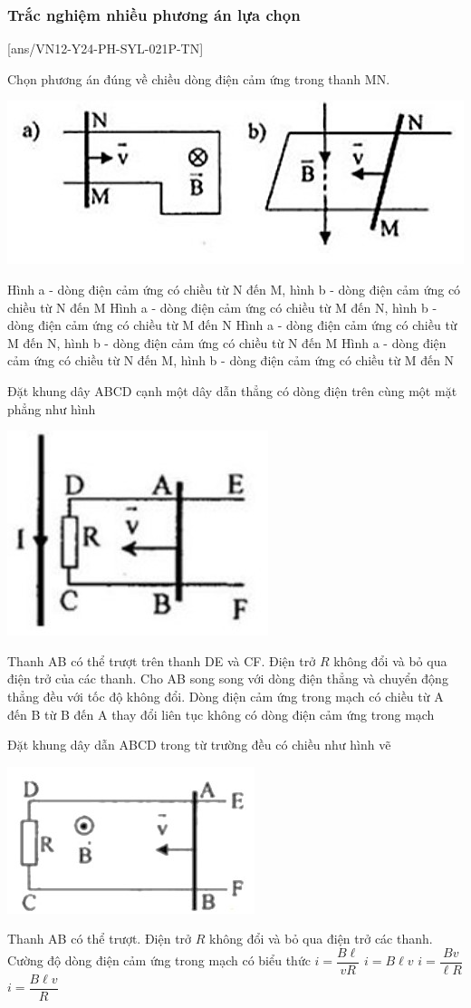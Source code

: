 \subsubsection{Trắc nghiệm nhiều phương án lựa chọn}
\setcounter{ex}{0}
[ans/VN12-Y24-PH-SYL-021P-TN]
\begin{ex}
	Chọn phương án đúng về chiều dòng điện cảm ứng trong thanh MN.
	\begin{center}
		\includegraphics[width=0.4\linewidth]{figs/VN12-Y24-PH-SYL-022P-1}
	\end{center}
	\choice
	{Hình a - dòng điện cảm ứng có chiều từ N đến M, hình b - dòng điện cảm ứng có chiều từ N đến M}
	{Hình a - dòng điện cảm ứng có chiều từ M đến N, hình b - dòng điện cảm ứng có chiều từ M đến N}
	{\True Hình a - dòng điện cảm ứng có chiều từ M đến N, hình b - dòng điện cảm ứng có chiều từ N đến M}
	{Hình a - dòng điện cảm ứng có chiều từ N đến M, hình b - dòng điện cảm ứng có chiều từ M đến N}
	\loigiai{}
\end{ex}
\begin{ex}
	Đặt khung dây ABCD cạnh một dây dẫn thẳng có dòng điện trên cùng một mặt phẳng như hình
	\begin{center}
		\includegraphics[width=0.25\linewidth]{figs/VN12-Y24-PH-SYL-022P-3}
	\end{center}
	Thanh AB có thể trượt trên thanh DE và CF. Điện trở $R$ không đổi và bỏ qua điện trở của các thanh. Cho AB song song với dòng điện thẳng và chuyển động thẳng đều với tốc độ không đổi. Dòng điện cảm ứng trong mạch có chiều
	\choice
	{từ  A đến B}
	{\True từ B đến A}
	{thay đổi liên tục}
	{không có dòng điện cảm ứng trong mạch}
	\loigiai{}
\end{ex}
\begin{ex}
	Đặt khung dây dẫn ABCD trong từ trường đều có chiều như hình vẽ
	\begin{center}
		\includegraphics[width=0.25\linewidth]{figs/VN12-Y24-PH-SYL-022P-4}
	\end{center}
	Thanh AB có thể trượt. Điện trở $R$ không đổi và bỏ qua điện trở các thanh. Cường độ dòng điện cảm ứng trong mạch có biểu thức
	\choice
	{$i=\dfrac{B\ell}{vR}$}
	{$i=B\ell v$}
	{$i=\dfrac{Bv}{\ell R}$}
	{\True $i=\dfrac{B\ell v}{R}$}
	\loigiai{}
\end{ex}


